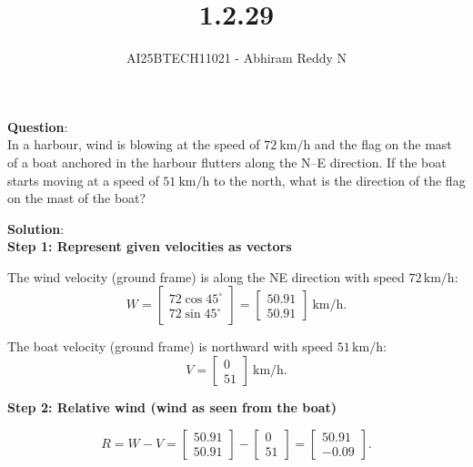 \documentclass[journal]{IEEEtran}
\begin{document}

\vspace{3cm}

\title{1.2.29}
\author{AI25BTECH11021 - Abhiram Reddy N}
{\let\newpage\relax\maketitle}

\renewcommand{\thefigure}{\theenumi}
\renewcommand{\thetable}{\theenumi}
\setlength{\intextsep}{10pt} %


\renewcommand{\thetable}{\theenumi}


\textbf{Question}:\\In a harbour, wind is blowing at the speed of $72\ \mathrm{km/h}$ and the flag on the mast of a boat anchored in the harbour flutters along the N--E direction. If the boat starts moving at a speed of $51\ \mathrm{km/h}$ to the north, what is the direction of the flag on the mast of the boat?


\textbf{Solution}:\\

\textbf{Step 1: Represent given velocities as vectors}

The wind velocity (ground frame) is along the NE direction with speed $72 \,\text{km/h}$:
\[
W = \begin{bmatrix} 72 \cos 45^\circ \\ 72 \sin 45^\circ \end{bmatrix}
= \begin{bmatrix} 50.91 \\ 50.91 \end{bmatrix} \ \text{km/h}.
\]

The boat velocity (ground frame) is northward with speed $51 \,\text{km/h}$:
\[
V = \begin{bmatrix} 0 \\ 51 \end{bmatrix} \ \text{km/h}.
\]

\textbf{Step 2: Relative wind (wind as seen from the boat)}

\[
R = W - V
= \begin{bmatrix} 50.91 \\ 50.91 \end{bmatrix} -
\begin{bmatrix} 0 \\ 51 \end{bmatrix}
= \begin{bmatrix} 50.91 \\ -0.09 \end{bmatrix}.
\]
\end{document}
